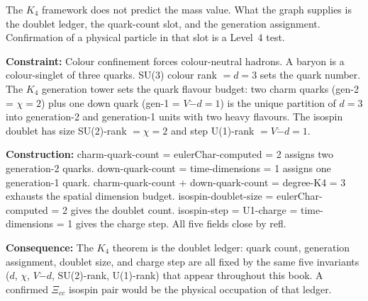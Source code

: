 \documentclass[11pt,a4paper]{book}
\def\texttt#1{#1}%
\begin{document}
The $K_4$ framework does not predict the mass value. What the graph supplies is the doublet ledger, the quark-count slot, and the generation assignment. Confirmation of a physical particle in that slot is a Level~4 test.

\medskip

\textbf{Constraint:} Colour confinement forces colour-neutral hadrons. A baryon is a colour-singlet of three quarks. SU(3) colour rank $= d = 3$ sets the quark number. The $K_4$ generation tower sets the quark flavour budget: two charm quarks (gen-2 = $\chi = 2$) plus one down quark (gen-1 = $V \dot{-} d = 1$) is the unique partition of $d = 3$ into generation-2 and generation-1 units with two heavy flavours. The isospin doublet has size SU(2)-rank $= \chi = 2$ and step U(1)-rank $= V \dot{-} d = 1$.

\textbf{Construction:} \texttt{charm-quark-count = eulerChar-computed = 2} assigns two generation-2 quarks. \texttt{down-quark-count = time-dimensions = 1} assigns one generation-1 quark. \texttt{charm-quark-count + down-quark-count = degree-K4 = 3} exhausts the spatial dimension budget. \texttt{isospin-doublet-size = eulerChar-computed = 2} gives the doublet count. \texttt{isospin-step = U1-charge = time-dimensions = 1} gives the charge step. All five fields close by \texttt{refl}.

\textbf{Consequence:} The $K_4$ theorem is the doublet ledger: quark count, generation assignment, doublet size, and charge step are all fixed by the same five invariants ($d$, $\chi$, $V \dot{-} d$, SU(2)-rank, U(1)-rank) that appear throughout this book. A confirmed $\Xi_{cc}$ isospin pair would be the physical occupation of that ledger.
\end{document}

